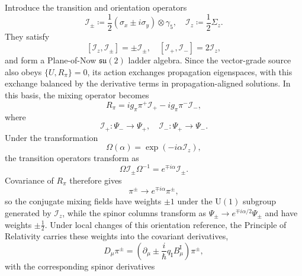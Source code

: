 Introduce the transition and orientation operators
\begin{equation}
    \mathcal{I}_{\pm} \coloneqq \frac{1}{2}\left(\sigma_{x} \pm i\sigma_{y}\right) \otimes \gamma_{5}, \quad \mathcal{I}_{z} \coloneqq \frac{1}{2}\Sigma_{z}.
\end{equation}
They satisfy
\begin{equation}\label{eq_isospin_ladder_algebra}
    [\mathcal{I}_{z}, \mathcal{I}_{\pm}] = \pm\mathcal{I}_{\pm}, \quad [\mathcal{I}_{+}, \mathcal{I}_{-}] = 2\mathcal{I}_{z},
\end{equation}
and form a Plane-of-Now $\mathfrak{su}(2)$ ladder algebra. Since the vector-grade source also obeys $\{U,R_{\pi}\}=0$, its action exchanges propagation eigenspaces, with this exchange balanced by the derivative terms in propagation-aligned solutions. In this basis, the mixing operator becomes
\begin{equation}\label{eq_pion_ladder_decomposition}
    R_{\pi} = ig_{\pi}\pi^{+}\mathcal{I}_{+} - ig_{\pi}\pi^{-}\mathcal{I}_{-},
\end{equation}
where
\begin{equation}
    \mathcal{I}_{+} : \Psi_{-} \to \Psi_{+}, \quad \mathcal{I}_{-} : \Psi_{+} \to \Psi_{-}.
\end{equation}
Under the transformation
\begin{equation}
    \Omega(\alpha) = \exp\left(-i\alpha\mathcal{I}_{z}\right),
\end{equation}
the transition operators transform as
\begin{equation}
    \Omega\mathcal{I}_{\pm}\Omega^{-1} = e^{\mp i\alpha}\mathcal{I}_{\pm}.
\end{equation}
Covariance of $R_{\pi}$ therefore gives
\begin{equation}
    \pi^{\pm} \to e^{\mp i\alpha}\pi^{\pm},
\end{equation}
so the conjugate mixing fields have weights $\pm1$ under the $\mathrm{U}(1)$ subgroup generated by $\mathcal{I}_{z}$, while the spinor columns transform as $\Psi_{\pm}\to e^{\mp i\alpha/2}\Psi_{\pm}$ and have weights $\pm\frac{1}{2}$. Under local changes of this orientation reference, the Principle of Relativity carries these weights into the covariant derivatives,
\begin{equation}\label{eq_pion_gauge_covariant_derivatives}
    D_{\mu}\pi^{\pm} = \left(\partial_{\mu} \pm \frac{i}{\hbar}q_{\mathrm{I}}B_{\mu}^{\mathrm{I}}\right)\pi^{\pm},
\end{equation}
with the corresponding spinor derivatives

